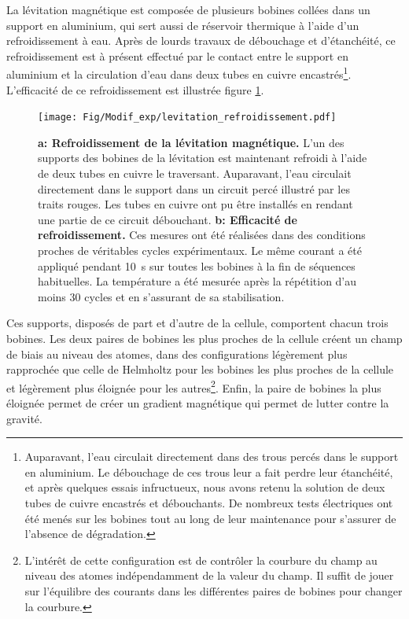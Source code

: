 La lévitation magnétique est composée de plusieurs bobines collées dans un support en aluminium, qui sert aussi de réservoir thermique à l'aide d'un refroidissement à eau. Après de lourds travaux de débouchage et d'étanchéité, ce refroidissement est à présent effectué par le contact entre le support en aluminium et la circulation d'eau dans deux tubes en cuivre encastrés\footnote{Auparavant, l'eau circulait directement dans des trous percés dans le support en aluminium. Le débouchage de ces trous leur a fait perdre leur étanchéité, et après quelques essais infructueux, nous avons retenu la solution de deux tubes de cuivre encastrés et débouchants. De nombreux tests électriques ont été menés sur les bobines tout au long de leur maintenance pour s'assurer de l'absence de dégradation.}. L'efficacité de ce refroidissement est illustrée figure \ref{fig:refroidissement_levitation}.

\begin{figure}
\centering
\texttt{[image: Fig/Modif\_exp/levitation\_refroidissement.pdf]}
\caption{\textbf{a: Refroidissement de la lévitation magnétique.} L'un des supports des bobines de la lévitation est maintenant refroidi à l'aide de deux tubes en cuivre le traversant. Auparavant, l'eau circulait directement dans le support dans un circuit percé illustré par les traits rouges. Les tubes en cuivre ont pu être installés en rendant une partie de ce circuit débouchant. \textbf{b: Efficacité de refroidissement.} Ces mesures ont été réalisées dans des conditions proches de véritables cycles expérimentaux. Le même courant a été appliqué pendant \SI{10}{\second} sur toutes les bobines à la fin de séquences habituelles. La température a été mesurée après la répétition d'au moins 30 cycles et en s'assurant de sa stabilisation.}
\label{fig:refroidissement_levitation}
\end{figure}


Ces supports, disposés de part et d'autre de la cellule, comportent chacun trois bobines. Les deux paires de bobines les plus proches de la cellule créent un champ de biais au niveau des atomes, dans des configurations légèrement plus rapprochée que celle de Helmholtz pour les bobines les plus proches de la cellule et légèrement plus éloignée pour les autres\footnote{L'intérêt de cette configuration est de contrôler la courbure du champ au niveau des atomes indépendamment de la valeur du champ. Il suffit de jouer sur l'équilibre des courants dans les différentes paires de bobines pour changer la courbure.}. Enfin, la paire de bobines la plus éloignée permet de créer un gradient magnétique qui permet de lutter contre la gravité.

